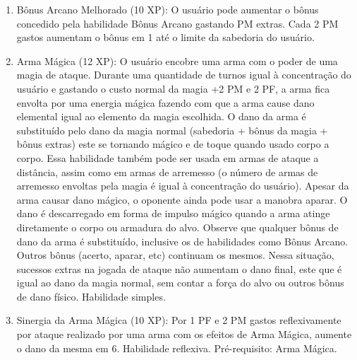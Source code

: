 \begin{enumerate}
  \item Bônus Arcano Melhorado (10 XP): O usuário pode aumentar o bônus concedido pela habilidade Bônus Arcano gastando PM extras. Cada 2 PM gastos aumentam o bônus em 1 até o limite da sabedoria do usuário. 
  
    
  \item Arma Mágica (12 XP): O usuário encobre uma arma com o poder de uma magia de ataque. Durante uma quantidade de turnos igual à concentração do usuário e gastando o custo normal da magia +2 PM e 2 PF, a arma fica envolta por uma energia mágica fazendo com que a arma cause dano elemental igual ao elemento da magia escolhida. O dano da arma é substituído pelo dano da magia normal (sabedoria + bônus da magia + bônus extras) este se tornando mágico e de toque quando usado corpo a corpo. Essa habilidade também pode ser usada em armas de ataque a distância, assim como em armas de arremesso (o número de armas de arremesso envoltas pela magia é igual à concentração do usuário). Apesar da arma causar dano mágico, o oponente ainda pode usar a manobra aparar. O dano é descarregado em forma de impulso mágico quando a arma atinge diretamente o corpo ou armadura do alvo. Observe que qualquer bônus de dano da arma é substituído, inclusive os de habilidades como Bônus Arcano. Outros bônus (acerto, aparar, etc) continuam os mesmos. Nessa situação, sucessos extras na jogada de ataque não aumentam o dano final, este que é igual ao dano da magia normal, sem contar a força do alvo ou outros bônus de dano físico. Habilidade simples. 
  
  \item Sinergia da Arma Mágica (10 XP): Por 1 PF e 2 PM gastos reflexivamente por ataque realizado por uma arma com os efeitos de Arma Mágica, aumente o dano da mesma em 6. Habilidade reflexiva. Pré-requisito: Arma Mágica. 
  

\end{enumerate}
